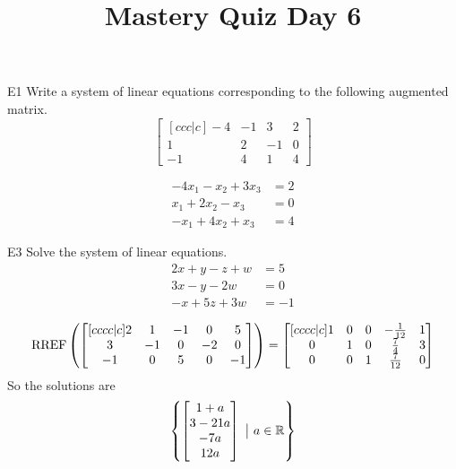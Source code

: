 \documentclass{sbgLAquiz}
\title{Mastery Quiz Day 6 }
\begin{document}
\begin{problem}{E1}
Write a system of linear equations corresponding to the following
augmented matrix.
\[
\begin{bmatrix}[ccc|c]
-4 & -1 & 3 & 2  \\
1 & 2 & -1 & 0 \\
-1 & 4 & 1 & 4
\end{bmatrix}
\]
\end{problem}
\begin{solution}
\begin{align*}
-4x_1-x_2+3x_3&=2 \\
x_1+2x_2-x_3 &= 0 \\
-x_1+4x_2+x_3&=4
\end{align*}
\end{solution}

\begin{problem}{E3} 
Solve the system of linear equations.
\begin{align*}
2x+y-z+w &=5 \\
3x-y-2w &= 0 \\
-x+5z+3w&=-1
\end{align*}
\end{problem}
\begin{solution}
$$\operatorname{RREF}\left( \begin{bmatrix}[cccc|c] 2 & 1 & -1 & 0 & 5 \\ 3 & -1 & 0 & -2 & 0 \\ -1 & 0 & 5 & 0 & -1 \end{bmatrix} \right) = \begin{bmatrix}[cccc|c] 1 & 0 & 0 & -\frac{1}{12} & 1 \\ 0 & 1 & 0 & \frac{7}{4} & 3 \\ 0 & 0 & 1 & \frac{7}{12} & 0 \end{bmatrix}$$
So the solutions are $$\left\{ \begin{bmatrix} 1+a \\ 3-21a \\ -7a \\ 12a \end{bmatrix}\ \big|\ a \in \mathbb{R}\right\}$$
\end{solution}
\end{document}
